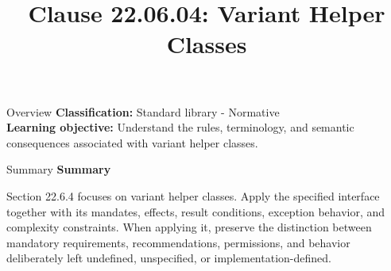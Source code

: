 \documentclass[10pt,letterpaper]{article}
\title{Clause 22.06.04: Variant Helper Classes}
\author{}
\date{}
\begin{document}
\maketitle
\begin{CornellOverviewBox}{Overview}
\textbf{Classification:} Standard library - Normative\\[2pt]
\textbf{Learning objective:} Understand the rules, terminology, and semantic consequences associated with variant helper classes.
\end{CornellOverviewBox}\begin{CornellSummaryBox}{Summary}
{\sffamily\bfseries\color{Accent} Summary}\par\vspace{3pt}Section 22.6.4 focuses on variant helper classes. Apply the specified interface together with its mandates, effects, result conditions, exception behavior, and complexity constraints. When applying it, preserve the distinction between mandatory requirements, recommendations, permissions, and behavior deliberately left undefined, unspecified, or implementation-defined.
\end{CornellSummaryBox}
\end{document}

